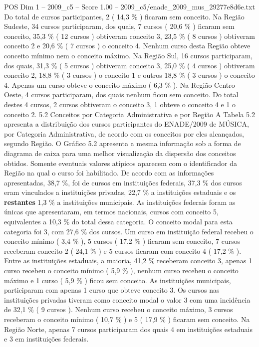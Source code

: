 \begin{textsample}{POS Dim 1 – 2009\_c5 – Score 1.00 – 2009\_c5/enade\_2009\_mus\_29277e8d6e.txt}
Do total de cursos participantes, 2 ( 14,3 \% ) ficaram sem conceito.
Na Região Sudeste, 34 cursos participaram, dos quais, 7 cursos ( 20,6 \% ) ficaram sem conceito, 35,3 \% ( 12 cursos ) obtiveram conceito 3, 23,5 \% ( 8 cursos ) obtiveram conceito 2 e 20,6 \% ( 7 cursos ) o conceito 4.
Nenhum curso desta Região obteve conceito mínimo nem o conceito máximo.
Na Região Sul, 16 cursos participaram, dos quais, 31,3 \% ( 5 cursos ) obtiveram conceito 3, 25,0 \% ( 4 cursos ) obtiveram conceito 2, 18,8 \% ( 3 cursos ) o conceito 1 e outros 18,8 \% ( 3 cursos ) o conceito 4.
Apenas um curso obteve o conceito máximo ( 6,3 \% ).
Na Região Centro-Oeste, 4 cursos participaram, dos quais nenhum ficou sem conceito.
Do total destes 4 cursos, 2 cursos obtiveram o conceito 3, 1 obteve o conceito 4 e 1 o conceito 2. 5.2 Conceitos por Categoria Administrativa e por Região A Tabela 5.2 apresenta a distribuição dos cursos participantes do ENADE/2009 de MÚSICA, por Categoria Administrativa, de acordo com os conceitos por eles alcançados, segundo Região.
O Gráfico 5.2 apresenta a mesma informação sob a forma de diagrama de caixa para uma melhor visualização da dispersão dos conceitos obtidos.
Somente eventuais valores atípicos aparecem com o identificador da Região na qual o curso foi habilitado.
De acordo com as informações apresentadas, 38,7 \%, foi de cursos em instituições federais, 37,3 \% dos cursos eram vinculados a instituições privadas, 22,7 \% a instituições estaduais e os \textbf{restantes} 1,3 \% a instituições municipais.
As instituições federais foram as únicas que apresentaram, em termos nacionais, cursos com conceito 5, equivalentes a 10,3 \% do total dessa categoria.
O conceito modal para esta categoria foi 3, com 27,6 \% dos cursos.
Um curso em instituição federal recebeu o conceito mínimo ( 3,4 \% ), 5 cursos ( 17,2 \% ) ficaram sem conceito, 7 cursos receberam conceito 2 ( 24,1 \% ) e 5 cursos ficaram com conceito 4 ( 17,2 \% ).
Entre as instituições estaduais, a maioria, 41,2 \% receberam conceito 3, apenas 1 curso recebeu o conceito mínimo ( 5,9 \% ), nenhum curso recebeu o conceito máximo e 1 curso ( 5,9 \% ) ficou sem conceito.
As instituições municipais, participaram com apenas 1 curso que obteve conceito 3.
Os cursos nas instituições privadas tiveram como conceito modal o valor 3 com uma incidência de 32,1 \% ( 9 cursos ).
Nenhum curso recebeu o conceito máximo, 3 cursos receberam o conceito mínimo ( 10,7 \% ) e 5 ( 17,9 \% ) ficaram sem conceito.
Na Região Norte, apenas 7 cursos participaram dos quais 4 em instituições estaduais e 3 em instituições federais.

\end{textsample}
